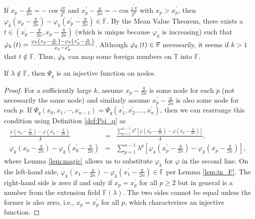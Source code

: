 \begin{remark*}
  If $x_p - \frac{q}{2n} = -\cos\frac{j\pi}{2^k}$ and $x_p^\prime - \frac{q}{2n} = -\cos \frac{j^\prime \pi}{2^k}$ with $x_p > x_p^\prime$, then $\varphi_k\left(x_p - \frac{q}{2n}\right) - \varphi_k\left(x_p^\prime - \frac{q}{2n}\right) \in \mathbb{F}$. By the Mean Value Theorem, there exists a $t \in \left(x_p^\prime - \frac{q}{2n}, x_p - \frac{q}{2n}\right)$ (which is unique because $\varphi_k$ is increasing) such that $\dotvarphi[t]{k} = \frac{\varphi_k\left(x_p - \frac{q}{2n}\right) - \varphi_k\left(x_p^\prime - \frac{q}{2n}\right)}{x_p - x_p^\prime}$. Although $\dotvarphi[t]{k} \in \mathbb{F}$ necessarily, it seems if $k > 1$ that $t \notin \mathbb{F}$. Thus, $\dotvarphi{k}$ can map some foreign numbers on $\mathbb{T}$ into $\mathbb{F}$.
\end{remark*}

\begin{lemma}
  \label{lem:injective}
  If $\lambda \notin \mathbb{F}$, then $\Psi_q$ is an injective function on nodes.
\end{lemma}
\begin{proof}
  For a sufficiently large $k$, assume $x_p - \frac{q}{2n}$ is some node for each $p$ (not necessarily the same node) and similarly assume $x_p^\prime - \frac{q}{2n}$ is also some node for each $p$. If $\Psi_q\left(x_0, x_1, \cdots, x_{n - 1}\right) = \Psi_q\left(x_1^\prime, x_2^\prime, \dots, x_n^\prime\right)$, then we can rearrange this condition using Definition \ref{def:Psi_q} as
  \begin{eqnarray*}
      \frac{\varphi\left(x_0 - \frac{q}{2n}\right) - \varphi\left(x_0^\prime - \frac{q}{2n}\right)}{\Lambda} &=& \frac{\sum\limits_{p = 1}^{n - 1}\lambda^p \left[\varphi\left(x_p^\prime - \frac{q}{2n}\right) - \varphi\left(x_p - \frac{q}{2n}\right)\right]}{\Lambda}, \\
      \varphi_k\left(x_0 - \frac{q}{2n}\right) - \varphi_k\left(x_0^\prime - \frac{q}{2n}\right) &=& \sum\limits_{p = 1}^{n - 1}\lambda^p \left[\varphi_k\left(x_p^\prime - \frac{q}{2n}\right) - \varphi_k\left(x_p - \frac{q}{2n}\right)\right],
  \end{eqnarray*}
  where Lemma \ref{lem:magic} allows us to substitute $\varphi_k$ for $\varphi$ in the second line. On the left-hand side, $\varphi_k\left(x_1 - \frac{q}{2n}\right) - \varphi_k\left(x_1^\prime - \frac{q}{2n}\right) \in \mathbb{F}$ per Lemma \ref{lem:in_F}. The right-hand side is zero if and only if $x_p = x_p^\prime$ for all $p \geq 2$ but in general is a number from the extension field $\mathbb{F}\left(\lambda\right)$. The two sides cannot be equal unless the former is also zero, i.e., $x_p = x_p^\prime$ for all $p$, which characterizes an injective function.
\end{proof}

